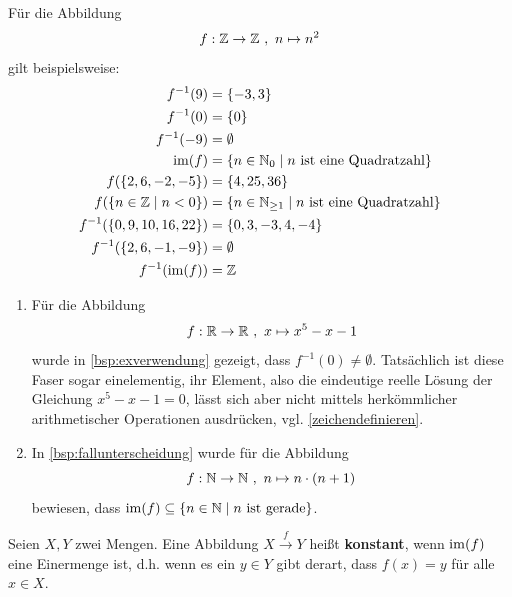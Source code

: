 \begin{bsp}
    Für die Abbildung
    \begin{align*}
        f: \mathbb Z \to \mathbb Z \ ,\ n \mapsto n^2
    \end{align*}
    gilt beispielsweise:
    \begin{align*}
        f^{-1}(9) & = \{-3,3\} \\
        f^{-1}(0) & = \{0\} \\
        f^{-1}(-9) & = \emptyset \\
        \im(f) & = \{n\in \N_0 \mid n\ \text{ist eine Quadratzahl} \} \\
        f( \{2,6,-2,-5\}) & = \{4,25,36\} \\
        f(\{n\in \Z \mid n < 0  \}) & = \{n\in \N_{\ge 1} \mid n\ \text{ist eine Quadratzahl} \} \\
        f^{-1}(\{0,9,10,16,22\}) & = \{0,3,-3,4,-4\} \\
        f^{-1}(\{2,6,-1,-9\}) & = \emptyset \\
        f^{-1}(\im(f)) & = \Z
    \end{align*}
\end{bsp}


\begin{bsp}[*] \quad
    \begin{enumerate}
        \item Für die Abbildung
            \[ f : \R \to \R \ ,\ x\mapsto x^5-x-1 \]
        wurde in \cref{bsp:exverwendung} gezeigt, dass $f^{-1}(0)\neq\emptyset$. Tatsächlich ist diese Faser sogar einelementig, ihr Element, also die eindeutige reelle Lösung der Gleichung $x^5-x-1=0$, lässt sich aber nicht mittels herkömmlicher arithmetischer Operationen ausdrücken, vgl. \cref{zeichendefinieren}.
        \item In \cref{bsp:fallunterscheidung} wurde für die Abbildung
            \[ f : \N \to \N \ ,\ n \mapsto n\cdot (n+1) \]
        bewiesen, dass $\operatorname{im}(f)\subseteq \{n\in \mathbb N\mid n\ \text{ist gerade}\}$.
    \end{enumerate}
\end{bsp}


\begin{defin} 
    Seien $X,Y$ zwei Mengen. Eine Abbildung $X\xrightarrow{f} Y$ heißt \textbf{konstant}, wenn $\operatorname{im}(f)$ eine Einermenge ist, d.h. wenn es ein $y\in Y$ gibt derart, dass $f(x)=y$ für alle $x\in X$.
\end{defin}


